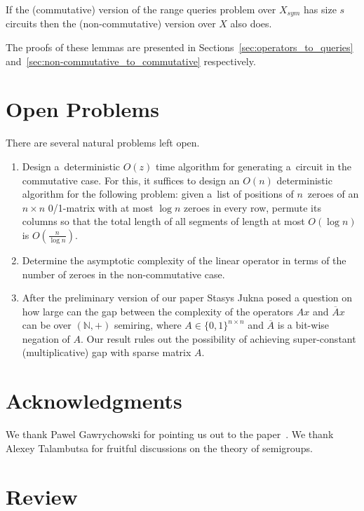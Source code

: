 \documentclass[review,onefignum,onetabnum]{siamart190516}
\begin{document}
\begin{lemma} \label{lem:intervals}
If the (commutative) version of the range queries problem over $X_{sym}$ has
size $s$ circuits then the (non-commutative) version over $X$ also does.
\end{lemma}

The proofs of these lemmas are presented in
Sections~\ref{sec:operators_to_queries}
and~\ref{sec:non-commutative_to_commutative} respectively.



\section{Open Problems}
There are several natural problems left open.
\begin{enumerate}
\item Design a~deterministic $O(z)$ time algorithm for generating
a~circuit in the commutative case.
For this, it suffices to design an $O(n)$ deterministic algorithm for the
following problem: given a~list of positions of $n$~zeroes of an $n \times n$
0/1-matrix with at most $\log n$ zeroes in every row, permute its columns so
that the total length of all segments of length at most $O(\log n)$ is
$O(\frac{n}{\log n})$.
\item Determine the asymptotic complexity of the linear operator in terms of the number of zeroes in the non-commutative case.
\item After the preliminary version of our paper Stasys Jukna posed a question on how large can the gap between the complexity of the operators $Ax$ and $\overline{A}x$ can be over $(\mathbb{N},+)$ semiring, where $A \in \{0,1\}^{n\times n}$ and $\overline{A}$ is a bit-wise negation of $A$. Our result rules out the possibility of achieving super-constant (multiplicative) gap with sparse matrix $A$.

\end{enumerate}


\section*{Acknowledgments}
We thank Pawel Gawrychowski for pointing us out to the
paper~\cite{DBLP:journals/ijcga/ChazelleR91}. We thank Alexey Talambutsa for
fruitful discussions on the theory of semigroups.

\clearpage

\appendix
\section{Review}







\end{document}
